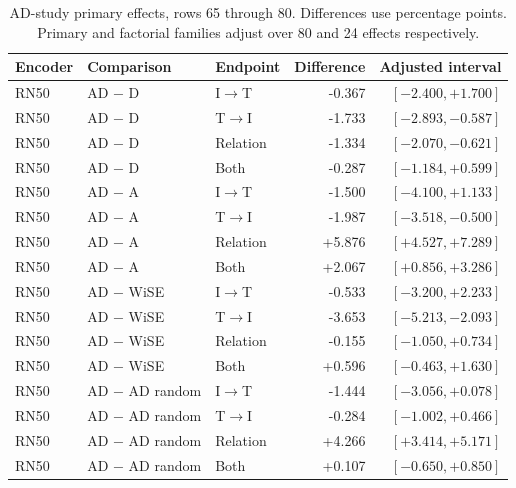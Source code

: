 \begin{table}[t]
\centering
\small
\setlength{\tabcolsep}{3pt}
\begin{tabular}{lllrr}
\toprule
Encoder & Comparison & Endpoint & Difference & Adjusted interval\\
\midrule
RN50 & AD $-$ D & I$\to$T & -0.367 & $[-2.400,+1.700]$ \\
RN50 & AD $-$ D & T$\to$I & -1.733 & $[-2.893,-0.587]$ \\
RN50 & AD $-$ D & Relation & -1.334 & $[-2.070,-0.621]$ \\
RN50 & AD $-$ D & Both & -0.287 & $[-1.184,+0.599]$ \\
RN50 & AD $-$ A & I$\to$T & -1.500 & $[-4.100,+1.133]$ \\
RN50 & AD $-$ A & T$\to$I & -1.987 & $[-3.518,-0.500]$ \\
RN50 & AD $-$ A & Relation & +5.876 & $[+4.527,+7.289]$ \\
RN50 & AD $-$ A & Both & +2.067 & $[+0.856,+3.286]$ \\
RN50 & AD $-$ WiSE & I$\to$T & -0.533 & $[-3.200,+2.233]$ \\
RN50 & AD $-$ WiSE & T$\to$I & -3.653 & $[-5.213,-2.093]$ \\
RN50 & AD $-$ WiSE & Relation & -0.155 & $[-1.050,+0.734]$ \\
RN50 & AD $-$ WiSE & Both & +0.596 & $[-0.463,+1.630]$ \\
RN50 & AD $-$ AD random & I$\to$T & -1.444 & $[-3.056,+0.078]$ \\
RN50 & AD $-$ AD random & T$\to$I & -0.284 & $[-1.002,+0.466]$ \\
RN50 & AD $-$ AD random & Relation & +4.266 & $[+3.414,+5.171]$ \\
RN50 & AD $-$ AD random & Both & +0.107 & $[-0.650,+0.850]$ \\
\bottomrule
\end{tabular}
\caption{AD-study primary effects, rows 65 through 80. Differences use percentage points. Primary and factorial families adjust over 80 and 24 effects respectively.}\label{tab:adprimary64}
\end{table}


